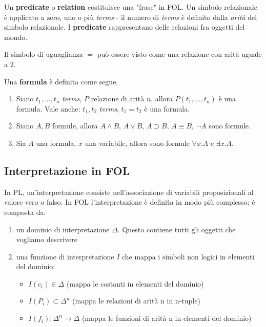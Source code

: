 Un \textbf{predicate} o \textbf{relation} costituisce una "frase" in FOL. Un simbolo relazionale è applicato a zero, uno o più \textit{terms} - il numero di \textit{terms} è definito dalla \textit{arità} del simbolo relazionale. I \textbf{predicate} rappresentano delle relazioni fra oggetti del mondo.

Il simbolo di uguaglianza $=$ può essere visto come una relazione con arità uguale a 2.

Una \textbf{formula} è definita come segue.
\begin{enumerate}
\item Siano $t_1, ..., t_n$ \textit{terms}, $P$ relazione di arità $n$, allora $P(t_1, ..., t_n)$ è una formula. Vale anche: $t_1, t_2$ \textit{terms}, $t_1 = t_2$ è una formula.
\item Siano $A, B$ formule, allora $A \land B$, $A \lor B$, $A \supset B$, $A \equiv B$, $\lnot A$ sono formule.
\item Sia $A$ una formula, $x$ una variabile, allora sono formule $\forall x. A$ e $\exists x. A$.
\end{enumerate}

\subsection{Interpretazione in FOL}

In PL, un'interpretazione consiste nell'associazione di variabili proposizionali al valore vero o falso. In FOL l'interpretazione è definita in modo più complesso; è composta da:
\begin{enumerate}
\item un dominio di interpretazione $\Delta$. Questo contiene tutti gli oggetti che vogliamo descrivere
\item una funzione di interpretazione $I$ che mappa i simboli non logici in elementi del dominio:
\begin{itemize}
\item $I (c_i) \in \Delta$ (mappa le costanti in elementi del dominio)
\item $I (P_i) \subset \Delta^n$ (mappa le relazioni di arità n in n-tuple)
\item $I (f_i): \Delta^n \to \Delta$ (mappa le funzioni di arità n in elementi del dominio)
\end{itemize}
\end{enumerate}

